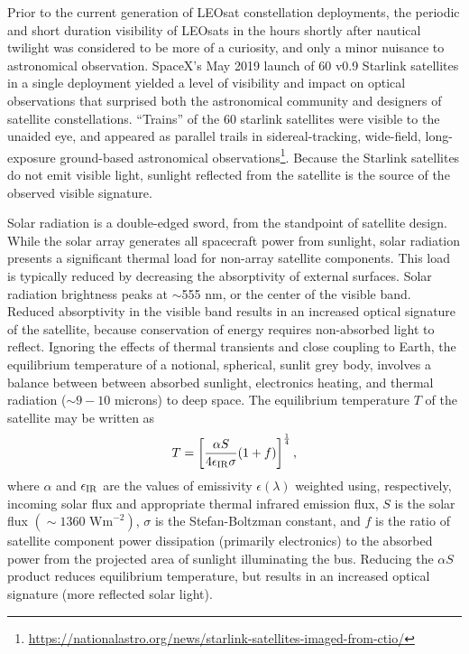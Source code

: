 \documentclass[twocolumn,trackchanges]{aastex63}
\begin{document}
Prior to the current generation of LEOsat constellation deployments, the periodic and short duration visibility of LEOsats in the hours shortly after nautical twilight was considered to be more of a curiosity, and only a minor nuisance to astronomical observation.
SpaceX's May 2019 launch of 60 v0.9 Starlink satellites in a single deployment yielded a level of visibility and impact on optical observations that surprised both the astronomical community and designers of satellite constellations. ``Trains'' of the 60 starlink satellites were visible to the unaided eye, and appeared as parallel trails in sidereal-tracking, wide-field, long-exposure ground-based astronomical observations\footnote{\url{https://nationalastro.org/news/starlink-satellites-imaged-from-ctio/}}. Because the Starlink satellites do not emit visible light, sunlight reflected from the satellite is the source of the observed visible signature.

Solar radiation is a double-edged sword, from the standpoint of satellite design. While the solar array generates all spacecraft power from sunlight, solar radiation presents a significant thermal load for non-array satellite components.  This load is typically reduced by decreasing the absorptivity of external surfaces. Solar radiation brightness peaks at $\sim$555 nm, or the center of the visible band.  Reduced absorptivity in the visible band results in an increased optical signature of the satellite, because conservation of energy requires non-absorbed light to reflect.  Ignoring the effects of thermal transients and close coupling to Earth, the equilibrium temperature of a notional, spherical, sunlit grey body, involves a balance between between absorbed sunlight, electronics heating, and thermal radiation ($\sim9-10$ microns) to deep space. The equilibrium temperature $T$ of the satellite may be written as
\begin{equation}
T = \left[\frac{\alpha S}{4\epsilon_{\rm IR} \sigma}(1+f)\right]^\frac{1}{4},
\end{equation}\label{starlink-temp}
\noindent where $\alpha$ and $\epsilon_{\rm IR}$ are the values of emissivity $\epsilon(\lambda)$ weighted using, respectively, incoming solar flux and appropriate thermal infrared emission flux, $S$ is the solar flux $(\sim1360 \textrm{ Wm}^{-2})$, $\sigma$ is the Stefan-Boltzman constant, and $f$ is the ratio of satellite component power dissipation (primarily electronics) to the absorbed power from the projected area of sunlight illuminating the bus. Reducing the $\alpha S$ product reduces equilibrium temperature, but results in an increased optical signature (more reflected solar light).
\end{document}
